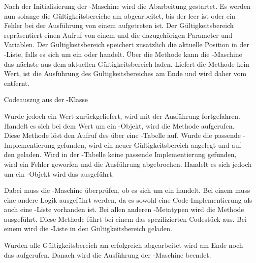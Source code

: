\SuperPar
Nach der Initialisierung der -Maschine wird die Abarbeitung gestartet. Es werden nun solange die Gültigkeitsbereiche am  abgearbeitet, bis der  leer ist oder ein Fehler bei der Ausführung von einem  aufgetreten ist. Der Gültigkeitsbereich repräsentiert einen Aufruf von einem  und die dazugehörigen Parameter und Variablen. Der Gültigkeitsbereich speichert zusätzlich die aktuelle Position in der -Liste, falls es sich um ein  oder  handelt. Über die Methode  kann die -Maschine das nächste  aus dem aktuellen Gültigkeitsbereich laden. Liefert die Methode kein Wert, ist die Ausführung des Gültigkeitsbereiches am Ende und wird daher vom  entfernt.

\begin{program}

\caption{Codeauszug aus der -Klasse}
\label{prog:runtime}
\end{program}

\SuperPar
Wurde jedoch ein Wert zurückgeliefert, wird mit der Ausführung fortgefahren. Handelt es sich bei dem Wert um ein -Objekt, wird die Methode  aufgerufen. Diese Methode löst den Aufruf des  über eine -Tabelle auf. Wurde die passende -Implementierung gefunden, wird ein neuer Gültigkeitsbereich angelegt und auf den  geladen. Wird in der -Tabelle keine passende Implementierung gefunden, wird ein Fehler geworfen und die Ausführung abgebrochen. Handelt es sich jedoch um ein -Objekt wird das  ausgeführt.  

\SuperPar
Dabei muss die -Maschine überprüfen, ob es sich um ein  handelt. Bei einem  muss eine andere Logik ausgeführt werden, da es sowohl eine Code-Implementierung als auch eine -Liste vorhanden ist. Bei allen anderen -Metatypen wird die Methode  ausgeführt. Diese Methode führt bei einem  das spezifizierten Codestück aus. Bei einem  wird die -Liste in den Gültigkeitsbereich geladen.

\SuperPar
Wurden alle Gültigkeitsbereich am  erfolgreich abgearbeitet wird am Ende noch das  aufgerufen. Danach wird die Ausführung der -Maschine beendet.

